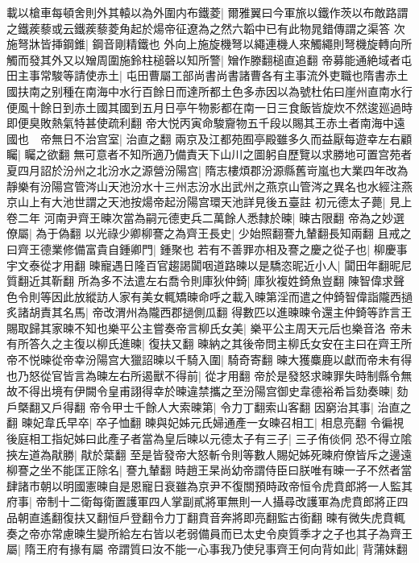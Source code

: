 載以槍車每頓舍則外其轅以為外圍内布鐵菱|{
	爾雅翼曰今軍旅以鐵作茨以布敵路謂之鐵蒺藜或云鐵蒺藜菱角起於煬帝征遼為之然六韜中已有此物晁錯傳謂之渠答}
次施弩牀皆挿鋼錐|{
	鋼音剛精鐵也}
外向上施旋機弩以繩連機人來觸繩則弩機旋轉向所觸而發其外又以矰周圍施鈴柱槌磬以知所警|{
	矰作滕翻槌直追翻}
帝募能通絶域者屯田主事常駿等請使赤土|{
	屯田曹屬工部尚書尚書諸曹各有主事流外吏職也隋書赤土國扶南之别種在南海中水行百餘日而達所都土色多赤因以為號杜佑曰崖州直南水行便風十餘日到赤土國其國到五月日亭午物影都在南一日三食飯皆旋炊不然逡廵過時即便臭敗熱氣特甚使疏利翻}
帝大悦丙寅命駿齎物五千段以賜其王赤土者南海中遠國也　帝無日不治宫室|{
	治直之翻}
兩京及江都苑囿亭殿雖多久而益厭每遊幸左右顧矚|{
	矚之欲翻}
無可意者不知所適乃備責天下山川之圖躬自歷覽以求勝地可置宫苑者夏四月詔於汾州之北汾水之源營汾陽宫|{
	隋志樓煩郡汾源縣舊岢嵐也大業四年改為靜樂有汾陽宫管涔山天池汾水十三州志汾水出武州之燕京山管涔之異名也水經注燕京山上有大池世謂之天池按煬帝起汾陽宫環天池詳見後五臺註}
初元德太子薨|{
	見上卷二年}
河南尹齊王暕次當為嗣元德吏兵二萬餘人悉隸於暕|{
	暕古限翻}
帝為之妙選僚屬|{
	為于偽翻}
以光祿少卿柳謇之為齊王長史|{
	少始照翻謇九輦翻長知兩翻}
且戒之曰齊王德業修備富貴自鍾卿門|{
	鍾聚也}
若有不善罪亦相及謇之慶之從子也|{
	柳慶事宇文泰從才用翻}
暕寵遇日隆百官趨謁闐咽道路暕以是驕恣昵近小人|{
	闐田年翻昵尼質翻近其靳翻}
所為多不法遣左右喬令則庫狄仲錡|{
	庫狄複姓錡魚豈翻}
陳智偉求聲色令則等因此放縱訪人家有美女輒矯暕命呼之載入暕第淫而遣之仲錡智偉詣隴西撾炙諸胡責其名馬|{
	帝改渭州為隴西郡撾側瓜翻}
得數匹以進暕暕令還主仲錡等詐言王賜取歸其家暕不知也樂平公主嘗奏帝言柳氏女美|{
	樂平公主周天元后也樂音洛}
帝未有所答久之主復以柳氏進暕|{
	復扶又翻}
暕納之其後帝問主柳氏女安在主曰在齊王所帝不悦暕從帝幸汾陽宫大獵詔暕以千騎入圍|{
	騎奇寄翻}
暕大獲麋鹿以獻而帝未有得也乃怒從官皆言為暕左右所遏獸不得前|{
	從才用翻}
帝於是發怒求暕罪失時制縣令無故不得出境有伊闕令皇甫詡得幸於暕違禁攜之至汾陽宫御史韋德裕希旨劾奏暕|{
	劾戶槩翻又戶得翻}
帝令甲士千餘人大索暕第|{
	令力丁翻索山客翻}
因窮治其事|{
	治直之翻}
暕妃韋氏早卒|{
	卒子恤翻}
暕與妃姊元氏婦通產一女暕召相工|{
	相息亮翻}
令徧視後庭相工指妃姊曰此產子者當為皇后暕以元德太子有三子|{
	三子侑倓侗}
恐不得立隂挾左道為猒勝|{
	猒於葉翻}
至是皆發帝大怒斬令則等數人賜妃姊死暕府僚皆斥之邊遠柳謇之坐不能匡正除名|{
	謇九輦翻}
時趙王杲尚幼帝謂侍臣曰朕唯有暕一子不然者當肆諸市朝以明國憲暕自是恩寵日衰雖為京尹不復關預時政帝恒令虎賁郎將一人監其府事|{
	帝制十二衛每衛置護軍四人掌副貳將軍無則一人攝尋改護軍為虎賁郎將正四品朝直遙翻復扶又翻恒戶登翻令力丁翻賁音奔將即亮翻監古銜翻}
暕有微失虎賁輒奏之帝亦常慮暕生變所給左右皆以老弱備員而已太史令庾質季才之子也其子為齊王屬|{
	隋王府有掾有屬}
帝謂質曰汝不能一心事我乃使兒事齊王何向背如此|{
	背蒲妹翻}
